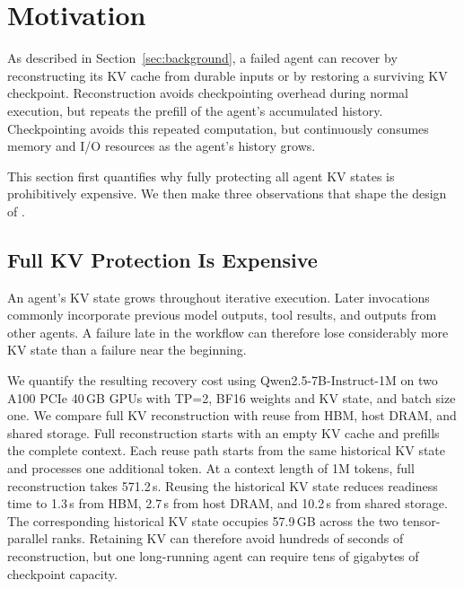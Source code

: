 \section{Motivation} \label{sec:motivation} 


As described in Section~\ref{sec:background}, a failed agent can recover by reconstructing its KV cache from durable inputs or by restoring a surviving KV checkpoint. Reconstruction avoids checkpointing overhead during normal execution, but repeats the prefill of the agent's accumulated history. Checkpointing avoids this repeated computation, but continuously consumes memory and I/O resources as the agent's history grows.

This section first quantifies why fully protecting all agent KV states is prohibitively expensive. We then make three observations that shape the design of \system. 

\subsection{Full KV Protection Is Expensive} \label{sec:motivation:cost} 

An agent's KV state grows throughout iterative execution. Later invocations commonly incorporate previous model outputs, tool results, and outputs from other agents. A failure late in the workflow can therefore lose considerably more KV state than a failure near the beginning.


We quantify the resulting recovery cost using Qwen2.5-7B-Instruct-1M on two A100 PCIe 40\,GB GPUs with TP=2, BF16 weights and KV state, and batch size one. %
We compare full KV reconstruction with reuse from HBM, host DRAM, and shared storage. Full reconstruction starts with an empty KV cache and prefills the complete context. Each reuse path starts from the same historical KV state and processes one additional token. 
%
At a context length of 1M tokens, full reconstruction takes 571.2\,s. Reusing the historical KV state reduces readiness time to 1.3\,s from HBM, 2.7\,s from host DRAM, and 10.2\,s from shared storage. The corresponding historical KV state occupies 57.9\,GB across the two tensor-parallel ranks. Retaining KV can therefore avoid hundreds of seconds of reconstruction, but one long-running agent can require tens of gigabytes of checkpoint capacity. 


